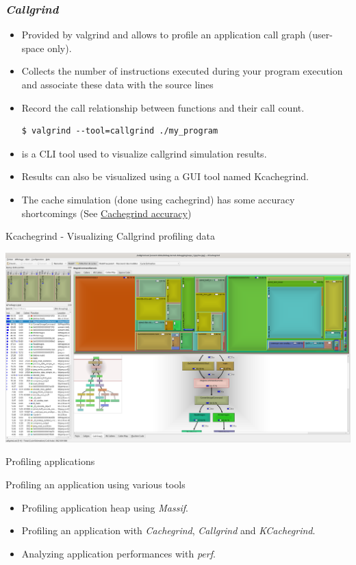\begin{frame}[fragile]
  \frametitle{{\em Callgrind}}
  \begin{itemize}
    \item Provided by valgrind and allows to profile an application call graph
          (user-space only).
    \item Collects the number of instructions executed during your program
          execution and associate these data with the source lines
    \item Record the call relationship between functions and their call
          count.
  \begin{block}{}
    \begin{verbatim}
$ valgrind --tool=callgrind ./my_program
    \end{verbatim}
  \end{block}

  \item {} is a CLI tool used to visualize callgrind
        simulation results.
  \item Results can also be visualized using a GUI tool named Kcachegrind.
  \item The cache simulation (done using cachegrind) has some accuracy
        shortcomings (See \href{https://valgrind.org/docs/manual/cg-manual.html#cg-manual.annopts.accuracy}{Cachegrind accuracy})
  \end{itemize}
\end{frame}

\begin{frame}{Kcachegrind - Visualizing Callgrind profiling data}
  \begin{center}
    \includegraphics[height=0.8\textheight]{slides/debugging-application-profiling/kcachegrind_callgrind.png}
  \end{center}
\end{frame}

\setuplabframe
{Profiling applications}
{
  Profiling an application using various tools
  \begin{itemize}
    \item Profiling application heap using {\em Massif}.
    \item Profiling an application with {\em Cachegrind}, {\em Callgrind} and
          {\em KCachegrind}.
    \item Analyzing application performances with {\em perf}.
  \end{itemize}
}